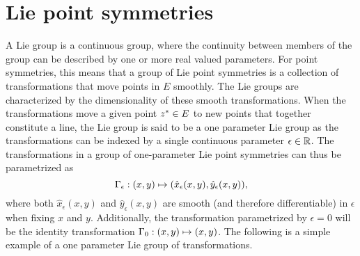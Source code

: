 \section{Lie point symmetries}

A Lie group is a continuous group, where the continuity between members of the group can be described by one or more real valued parameters.
For point symmetries, this means that a group of Lie point symmetries is a collection of transformations that move points in \(E\) smoothly.
The Lie groups are characterized by the dimensionality of these smooth transformations.
When the transformations move a given point \(z^* \in E\) to new points that together constitute a line, the Lie group is said to be a one parameter Lie group as the transformations can be indexed by a single continuous parameter \(\epsilon \in \mathbb{R}\).
The transformations in a group of one-parameter Lie point symmetries can thus be parametrized as
\begin{equation} \label{eq:1p-lie-point-symmetry}
  \Gamma_\epsilon: \pqty{x,y} \mapsto \pqty{\hat{x}_\epsilon(x,y), \hat{y}_\epsilon(x,y)},
\end{equation}
where both \(\hat{x}_\epsilon(x,y)\) and \(\hat{y}_\epsilon(x,y)\) are smooth (and therefore differentiable) in \(\epsilon\) when fixing \(x\) and \(y\).
Additionally, the transformation parametrized by \(\epsilon = 0\) will be the identity transformation \(\Gamma_0: \pqty{x,y} \mapsto \pqty{x,y}\).
The following is a simple example of a one parameter Lie group of transformations.
